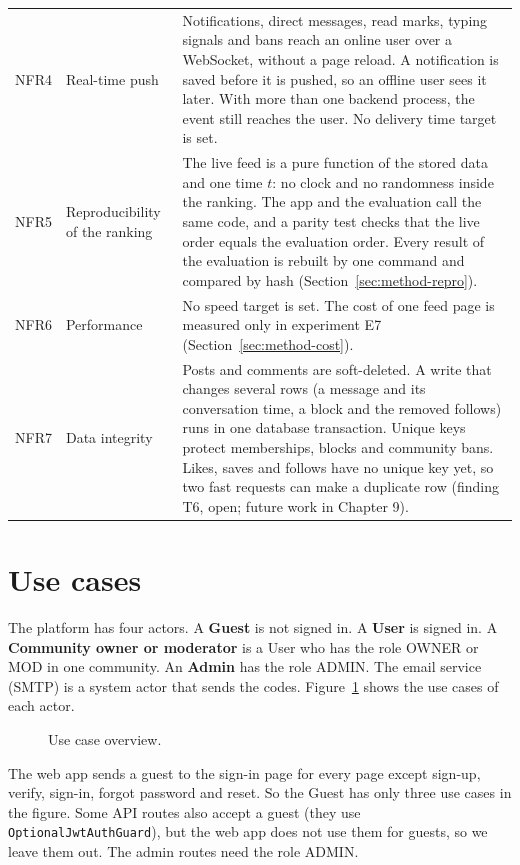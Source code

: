 {\begin{longtable}{@{}>{\raggedright\arraybackslash}p{1.3cm} >{\raggedright\arraybackslash}p{2.9cm} >{\raggedright\arraybackslash}p{\dimexpr\textwidth-4.2cm-4\tabcolsep\relax}@{}}
  NFR4 & Real-time push & Notifications, direct messages, read marks, typing signals and bans reach an online user over a WebSocket, without a page reload. A notification is saved before it is pushed, so an offline user sees it later. With more than one backend process, the event still reaches the user. No delivery time target is set. \\
  NFR5 & Reproducibility of the ranking & The live feed is a pure function of the stored data and one time $t$: no clock and no randomness inside the ranking. The app and the evaluation call the same code, and a parity test checks that the live order equals the evaluation order. Every result of the evaluation is rebuilt by one command and compared by hash (Section~\ref{sec:method-repro}). \\
  NFR6 & Performance & No speed target is set. The cost of one feed page is measured only in experiment E7 (Section~\ref{sec:method-cost}). \\
  NFR7 & Data integrity & Posts and comments are soft-deleted. A write that changes several rows (a message and its conversation time, a block and the removed follows) runs in one database transaction. Unique keys protect memberships, blocks and community bans. Likes, saves and follows have no unique key yet, so two fast requests can make a duplicate row (finding T6, open; future work in Chapter 9). \\
\end{longtable}}

\section{Use cases}
\label{sec:design-usecases}

The platform has four actors. A \textbf{Guest} is not signed in. A \textbf{User} is signed in. A \textbf{Community owner or moderator} is a User who has the role OWNER or MOD in one community. An \textbf{Admin} has the role ADMIN. The email service (SMTP) is a system actor that sends the codes. Figure~\ref{fig:design-usecase} shows the use cases of each actor.

\begin{figure}[htbp]
  \centering
  \caption{Use case overview.}
  \label{fig:design-usecase}
\end{figure}

The web app sends a guest to the sign-in page for every page except sign-up, verify, sign-in, forgot password and reset. So the Guest has only three use cases in the figure. Some API routes also accept a guest (they use \texttt{OptionalJwtAuthGuard}), but the web app does not use them for guests, so we leave them out. The admin routes need the role ADMIN.

